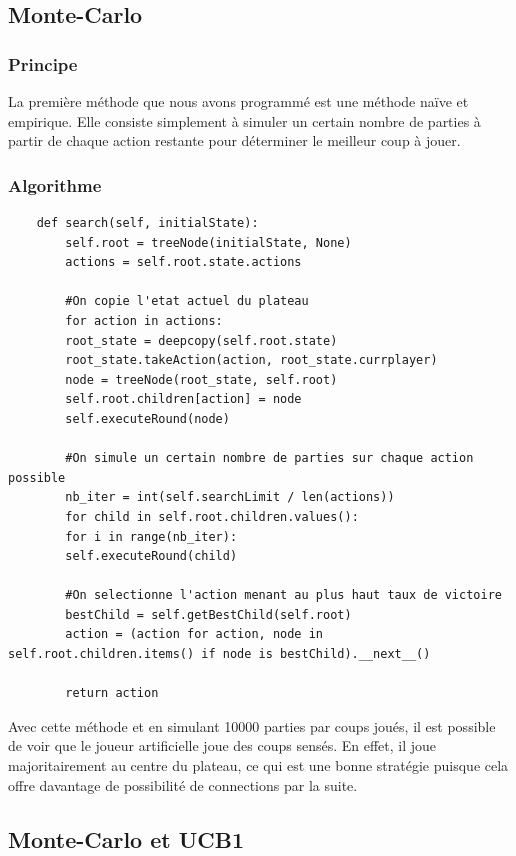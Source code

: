 \documentclass[a4paper]{article}
\theoremstyle{definition}
\begin{document}
\subsection{Monte-Carlo}

\subsubsection{Principe}

La première méthode que nous avons programmé est une méthode naïve et empirique. Elle consiste simplement à simuler un certain nombre de parties à partir de chaque action restante pour déterminer le meilleur coup à jouer.

\subsubsection{Algorithme}

\begin{lstlisting}
	def search(self, initialState):
		self.root = treeNode(initialState, None)
		actions = self.root.state.actions
	
		#On copie l'etat actuel du plateau
		for action in actions:
		root_state = deepcopy(self.root.state)
		root_state.takeAction(action, root_state.currplayer)
		node = treeNode(root_state, self.root)
		self.root.children[action] = node
		self.executeRound(node)
		
		#On simule un certain nombre de parties sur chaque action possible
		nb_iter = int(self.searchLimit / len(actions))
		for child in self.root.children.values():
		for i in range(nb_iter):
		self.executeRound(child)
		
		#On selectionne l'action menant au plus haut taux de victoire
		bestChild = self.getBestChild(self.root)
		action = (action for action, node in self.root.children.items() if node is bestChild).__next__()
		
		return action
\end{lstlisting}

Avec cette méthode et en simulant 10000 parties par coups joués, il est possible de voir que le joueur artificielle joue des coups sensés. En effet, il joue majoritairement au centre du plateau, ce qui est une bonne stratégie puisque cela offre davantage de possibilité de connections par la suite.

\newpage 


\subsection{Monte-Carlo et UCB1}
\end{document}
